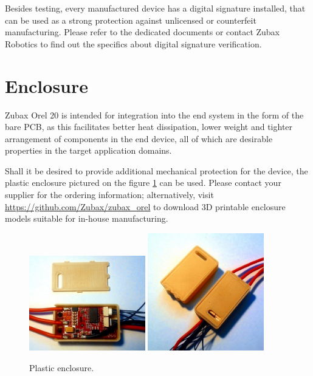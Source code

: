 \documentclass{zubaxdoc}
\begin{document}
Besides testing, every manufactured device has a digital signature installed,
that can be used as a strong protection against unlicensed or counterfeit manufacturing.
Please refer to the dedicated documents or contact Zubax Robotics to find out
the specifics about digital signature verification.

\section{Enclosure}\label{sec:enclosure}

Zubax Orel 20 is intended for integration into the end system in the form of the bare PCB,
as this facilitates better heat dissipation, lower weight and tighter arrangement of components
in the end device, all of which are desirable properties in the target application domains.

Shall it be desired to provide additional mechanical protection for the device,
the plastic enclosure pictured on the figure \ref{enclosure} can be used.
Please contact your supplier for the ordering information;
alternatively, visit \url{https://github.com/Zubax/zubax_orel} to download
3D printable enclosure models suitable for in-house manufacturing.

\begin{figure}[hb]
	\centering
	\includegraphics[width=0.45\textwidth]{enclosure-open}
	\includegraphics[width=0.45\textwidth]{enclosure-closed}
	\caption{Plastic enclosure.\label{enclosure}}
\end{figure}
\end{document}
